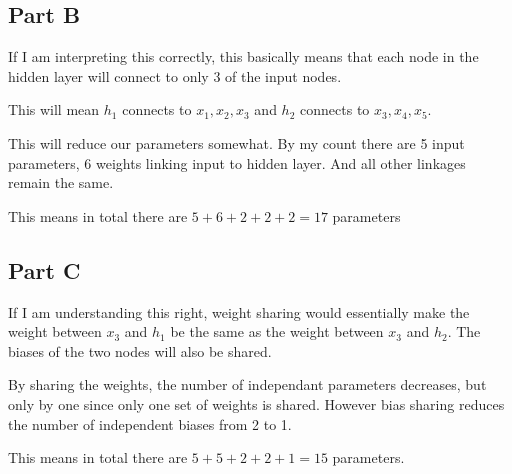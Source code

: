 \documentclass{article}
\begin{document}
\subsection*{Part B}
If I am interpreting this correctly, this basically means that each node in the hidden layer will connect to only 3 of the input nodes.

This will mean $h_1$ connects to $x_1,x_2,x_3$ and $h_2$ connects to $x_3,x_4,x_5$.

This will reduce our parameters somewhat. By my count there are 5 input parameters, 6 weights linking input to hidden layer. And all other linkages remain the same.

This means in total there are $\boxed{ 5+6+2+2+2=17}$ parameters


\subsection*{Part C}

If I am understanding this right, weight sharing would essentially make the weight between $x_3$ and $h_1$ be the same as the weight between $x_3$ and $h_2$. The biases of the two nodes will also be shared.

By sharing the weights, the number of independant parameters decreases, but only by one since only one set of weights is shared. However bias sharing reduces the number of independent biases from 2 to 1.


This means in total there are $\boxed{ 5+5+2+2+1=15}$ parameters.

\clearpage
\end{document}
